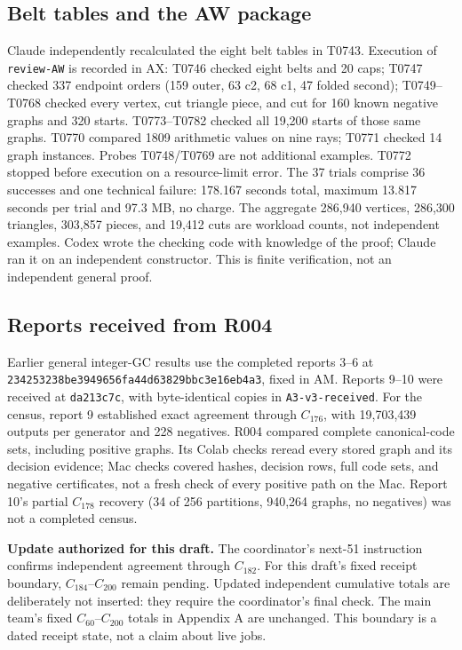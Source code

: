 \documentclass[11pt]{amsart}
\newcommand{\record}[1]{\nolinkurl{#1}}
\begin{document}
\subsection{Belt tables and the AW package}
Claude independently recalculated the eight belt tables in T0743.
Execution of \record{review-AW} is recorded in AX: T0746 checked eight
belts and 20 caps; T0747 checked 337 endpoint orders (159 outer,
63 c2, 68 c1, 47 folded second); T0749--T0768 checked every vertex,
cut triangle piece, and cut for 160 known negative graphs and 320
starts. T0773--T0782 checked all 19,200 starts of those same graphs.
T0770 compared 1809 arithmetic values on nine rays; T0771 checked
14 graph instances. Probes T0748/T0769 are not additional examples.
T0772 stopped before execution on a resource-limit error. The 37 trials
comprise 36 successes and one technical failure: 178.167 seconds total,
maximum 13.817 seconds per trial and 97.3 MB, no charge. The aggregate
286,940 vertices, 286,300 triangles, 303,857 pieces, and 19,412 cuts
are workload counts, not independent examples. Codex wrote the checking
code with knowledge of the proof; Claude ran it on an independent
constructor. This is finite verification, not an independent general proof.

\subsection{Reports received from R004}
Earlier general integer-GC results use the completed reports 3--6 at
\record{234253238be3949656fa44d63829bbc3e16eb4a3}, fixed in AM. Reports
9--10 were received at \record{da213c7c}, with byte-identical copies in
\record{A3-v3-received}. For the census, report 9 established exact
agreement through $C_{176}$, with 19,703,439 outputs per generator and
228 negatives. R004 compared complete canonical-code sets, including
positive graphs. Its Colab checks reread every stored graph and its
decision evidence; Mac checks covered hashes, decision rows, full code
sets, and negative certificates, not a fresh check of every positive
path on the Mac. Report 10's partial $C_{178}$ recovery (34 of 256
partitions, 940,264 graphs, no negatives) was not a completed census.

\textbf{Update authorized for this draft.} The coordinator's next-51
instruction confirms independent agreement through $C_{182}$.
For this draft's fixed receipt boundary, $C_{184}$--$C_{200}$ remain
pending. Updated independent cumulative totals are deliberately not
inserted: they require the coordinator's final check. The main team's
fixed $C_{60}$--$C_{200}$ totals in Appendix A are unchanged. This
boundary is a dated receipt state, not a claim about live jobs.
\end{document}
